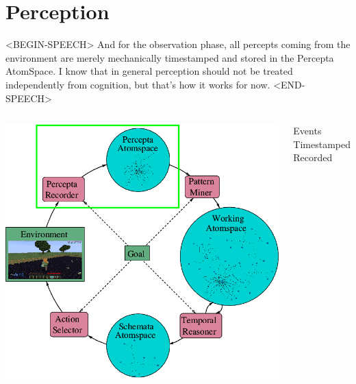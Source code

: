 \documentclass[aspectratio=169]{beamer}
\begin{document}
\begin{frame}

\end{frame}

\section{Perception}

\begin{frame}

  <BEGIN-SPEECH>
  And for the observation phase, all percepts coming
  from the environment are merely mechanically timestamped and stored
  in the Percepta AtomSpace.  I know that in general perception should
  not be treated independently from cognition, but that's how it works
  for now.
  <END-SPEECH>

  \begin{columns}
    \column{3.2in}
    \includegraphics[scale=0.3]{pictures/rocca-chart-perception-highlight-v0.7.png}
    \column{2.5in}
    \begin{center}
      Events\\
      Timestamped\\
      Recorded
    \end{center}
  \end{columns}
\end{frame}
\end{document}

